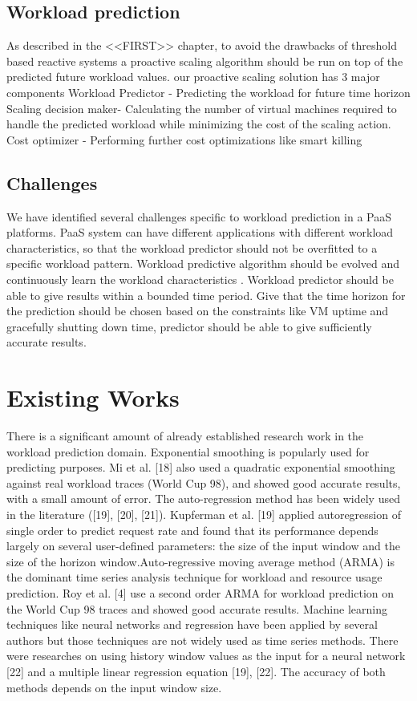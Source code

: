 
\subsection{Workload prediction }

As described in the <<FIRST>> chapter, to avoid the drawbacks of threshold based reactive systems a proactive scaling algorithm should be run on top of the predicted future workload values. our proactive scaling solution has 3 major components
Workload Predictor - Predicting the workload for future time horizon
Scaling decision maker- Calculating the number of virtual machines required to handle the predicted workload while minimizing the cost of the scaling action.
Cost optimizer - Performing further cost optimizations like smart killing

\subsection{Challenges}

We have identified several challenges specific to workload prediction in a PaaS platforms.
PaaS system can have different applications with different workload characteristics, so that the workload predictor should not be overfitted to a specific workload pattern.
Workload predictive algorithm should be evolved and continuously learn the workload characteristics . 
Workload predictor should be able to give results within a bounded time period.
Give that the  time horizon for the prediction should be chosen based on the constraints like VM uptime and gracefully shutting down time, predictor should be able to give sufficiently accurate results.

\section{Existing Works}

There is a significant amount of already established research work in the workload prediction domain. Exponential smoothing is popularly used for predicting purposes. Mi et al. [18] also used a quadratic exponential smoothing against real workload traces (World Cup 98), and showed good accurate results, with a small amount of error. The auto-regression method has been widely used in the literature ([19], [20], [21]). Kupferman et al. [19] applied autoregression of single order to predict request rate and found that its performance depends largely on several user-defined parameters: the size of the input window and the size of the horizon window.Auto-regressive moving average method (ARMA) is the dominant time series analysis technique for workload and resource usage prediction. Roy et al. [4] use a second order ARMA for workload prediction on the World Cup 98 traces and showed good accurate results. Machine learning techniques like neural networks and regression have been applied by several authors but those techniques are not widely used as time series methods. There were researches on using history window values as the input for a neural network [22] and a multiple linear regression equation [19], [22]. The accuracy of both methods depends on the input window size.


